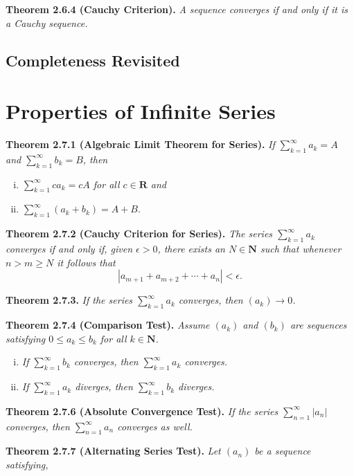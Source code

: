 \documentclass[12pt]{report}
\newcommand{\R}{\textbf{R}}
\newcommand{\N}{\textbf{N}}
\begin{document}
\noindent \textbf{Theorem 2.6.4 (Cauchy Criterion).} \textit{A sequence converges if and only if it is a Cauchy sequence.}

\subsection*{Completeness Revisited}

\section{Properties of Infinite Series}

\noindent \textbf{Theorem 2.7.1 (Algebraic Limit Theorem for Series).} \textit{If $\sum_{k=1}^\infty a_k=A$ and $\sum_{k=1}^\infty b_k=B$, then}

\begin{enumerate}[(i)]
\item \textit{$\sum_{k=1}^\infty ca_k=cA$ for all $c\in\R$ and}
\item $\sum_{k=1}^\infty(a_k+b_k)=A+B$.
\end{enumerate}
\bigskip

\noindent \textbf{Theorem 2.7.2 (Cauchy Criterion for Series).} \textit{The series $\sum_{k=1}^\infty a_k$ converges if and only if, given $\epsilon>0$, there exists an $N\in\N$ such that whenever $n>m\geq N$ it follows that}
\[|a_{m+1}+a_{m+2}+\cdots+a_n|<\epsilon.\]
\bigskip

\noindent \textbf{Theorem 2.7.3.} \textit{If the series $\sum_{k=1}^\infty a_k$ converges, then $(a_k)\rightarrow 0$.}
\bigskip

\noindent \textbf{Theorem 2.7.4 (Comparison Test).} \textit{Assume $(a_k)$ and $(b_k)$ are sequences satisfying $0\leq a_k\leq b_k$ for all $k\in\N$.}

\begin{enumerate}[(i)]
\item \textit{If $\sum_{k=1}^\infty b_k$ converges, then $\sum_{k=1}^\infty a_k$ converges.}
\item \textit{If $\sum_{k=1}^\infty a_k$ diverges, then $\sum_{k=1}^\infty b_k$ diverges.}
\end{enumerate}
\bigskip

\noindent \textbf{Theorem 2.7.6 (Absolute Convergence Test).} \textit{If the series $\sum_{n=1}^\infty |a_n|$ converges, then $\sum_{n=1}^\infty a_n$ converges as well.}
\bigskip

\noindent \textbf{Theorem 2.7.7 (Alternating Series Test).} \textit{Let $(a_n)$ be a sequence satisfying,}
\end{document}
